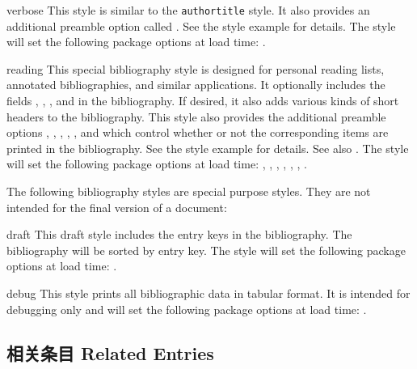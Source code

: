 \begin{marglist}
\item[verbose]
This style is similar to the \texttt{authortitle} style. It also provides an additional preamble option called . See the style example for details. The style will set the following package options at load time: .

\item[reading]
This special bibliography style is designed for personal reading lists, annotated bibliographies, and similar applications. It optionally includes the fields , , , and  in the bibliography. If desired, it also adds various kinds of short headers to the bibliography. This style also provides the additional preamble options , , , , , and  which control whether or not the corresponding items are printed in the bibliography. See the style example for details. See also . The style will set the following package options at load time: , , , , , , .

\end{marglist}

The following bibliography styles are special purpose styles. They are not intended for the final version of a document:

\begin{marglist}

\item[draft]
This draft style includes the entry keys in the bibliography. The bibliography will be sorted by entry key. The style will set the following package options at load time: .

\item[debug]
This style prints all bibliographic data in tabular format. It is intended for debugging only and will set the following package options at load time: .

\end{marglist}

\subsection{相关条目 Related Entries}
\label{use:rel}

